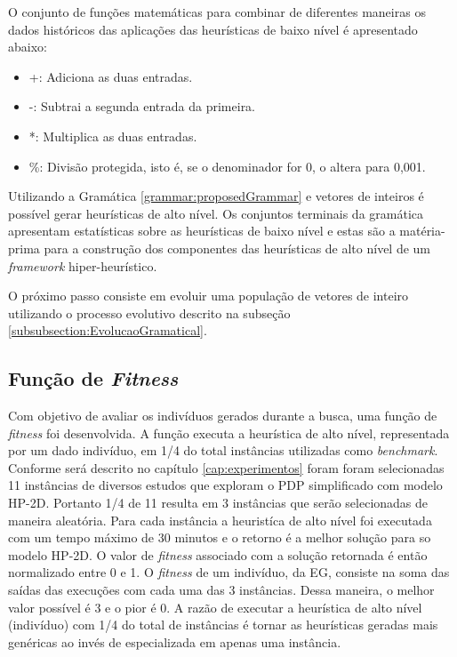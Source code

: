  
  
  O conjunto de funções matemáticas para combinar de diferentes maneiras os dados históricos das aplicações das heurísticas de baixo nível é apresentado abaixo:
  
  \begin{itemize}
  	\item +: Adiciona as duas entradas.
  	\item -: Subtrai a segunda entrada da primeira.
  	\item *: Multiplica as duas entradas.
  	\item \%: Divisão protegida, isto é, se o denominador for 0, o altera para 0,001.
  \end{itemize}
  
  
  Utilizando a Gramática \ref{grammar:proposedGrammar} e vetores de inteiros é possível gerar heurísticas de alto nível. Os conjuntos terminais da gramática apresentam estatísticas sobre as heurísticas de baixo nível e estas são a matéria-prima para a construção dos componentes das heurísticas de alto nível de um \textit{framework} hiper-heurístico. 
  
  

  
  O próximo passo consiste em evoluir uma população de vetores de inteiro utilizando o processo evolutivo descrito na subseção 
  \ref{subsubsection:EvolucaoGramatical}. %
  
  
  \subsection{Função de \textit{Fitness}}
  \label{sub:funcfitness}
  
  
  	
 Com objetivo de avaliar os indivíduos gerados durante a busca, uma função de \textit{fitness} foi desenvolvida. A função executa a heurística de alto nível, representada por um dado indivíduo, 
 em 1/4 do total instâncias utilizadas como \textit{benchmark}. Conforme será descrito no capítulo \ref{cap:experimentos} foram   foram selecionadas 11 instâncias de diversos estudos que exploram o PDP simplificado com modelo HP-2D. Portanto 1/4 de 11 resulta em 3 instâncias que serão selecionadas de maneira aleatória. Para cada instância a heuristíca de alto nível foi executada com um tempo máximo de 30 minutos e o retorno é a melhor solução para so modelo HP-2D. O valor de \textit{fitness} associado com a solução retornada é então normalizado entre 0 e 1. O \textit{fitness} de um indivíduo, da EG, consiste na soma das saídas das execuções com cada uma das 3 instâncias. Dessa maneira, o melhor valor possível é 3 e o pior é 0. A razão de executar a heurística de alto nível (indivíduo) com 1/4 do total de instâncias é tornar as heurísticas geradas mais genéricas ao invés de especializada em apenas uma instância. 
  
